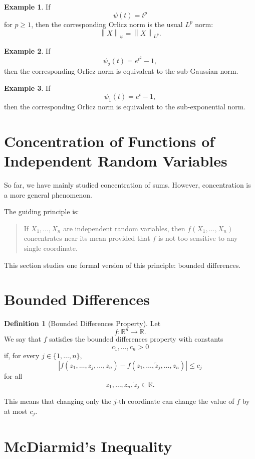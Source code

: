 \documentclass[12pt,oneside]{book}
\numberwithin{equation}{section}
\theoremstyle{definition}
\newtheorem{definition}{Definition}[section]
\newtheorem{example}{Example}[section]
\theoremstyle{plain}
\theoremstyle{remark}
\newcommand{\R}{\mathbb{R}}
\newcommand{\norm}[1]{\left\lVert #1 \right\rVert}
\begin{document}
\begin{example}
If
\[
\psi(t)=t^p
\]
for $p\geq1$, then the corresponding Orlicz norm is the usual $L^p$ norm:
\[
\norm{X}_{\psi}
=
\norm{X}_{L^p}.
\]
\end{example}

\begin{example}
If
\[
\psi_2(t)=e^{t^2}-1,
\]
then the corresponding Orlicz norm is equivalent to the sub-Gaussian norm.
\end{example}

\begin{example}
If
\[
\psi_1(t)=e^t-1,
\]
then the corresponding Orlicz norm is equivalent to the sub-exponential norm.
\end{example}

\section{Concentration of Functions of Independent Random Variables}

So far, we have mainly studied concentration of sums. However, concentration is a more general phenomenon.

The guiding principle is:

\begin{quote}
If $X_1,\dots,X_n$ are independent random variables, then $f(X_1,\dots,X_n)$ concentrates near its mean provided that $f$ is not too sensitive to any single coordinate.
\end{quote}

This section studies one formal version of this principle: bounded differences.

\section{Bounded Differences}

\begin{definition}[Bounded Differences Property]
Let
\[
f:\R^n\to\R.
\]
We say that $f$ satisfies the bounded differences property with constants
\[
c_1,\dots,c_n>0
\]
if, for every $j\in\{1,\dots,n\}$,
\[
\left|
f(z_1,\dots,z_j,\dots,z_n)
-
f(z_1,\dots,\widetilde{z}_j,\dots,z_n)
\right|
\leq
c_j
\]
for all
\[
z_1,\dots,z_n,\widetilde{z}_j\in\R.
\]
\end{definition}

This means that changing only the $j$-th coordinate can change the value of $f$ by at most $c_j$.

\section{McDiarmid's Inequality}
\end{document}
